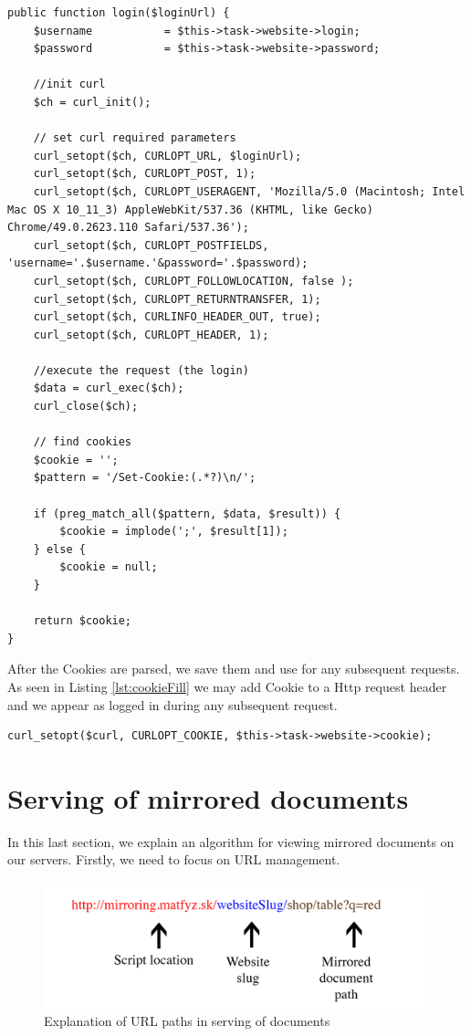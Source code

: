 \begin{lstlisting}[caption={Retrieving of a Cookie with Curl library},label={lst:login}]
public function login($loginUrl) {
    $username           = $this->task->website->login;
    $password           = $this->task->website->password;

    //init curl
    $ch = curl_init();
	
	// set curl required parameters
    curl_setopt($ch, CURLOPT_URL, $loginUrl);
    curl_setopt($ch, CURLOPT_POST, 1);
    curl_setopt($ch, CURLOPT_USERAGENT, 'Mozilla/5.0 (Macintosh; Intel Mac OS X 10_11_3) AppleWebKit/537.36 (KHTML, like Gecko) Chrome/49.0.2623.110 Safari/537.36');
    curl_setopt($ch, CURLOPT_POSTFIELDS, 'username='.$username.'&password='.$password);
    curl_setopt($ch, CURLOPT_FOLLOWLOCATION, false );
    curl_setopt($ch, CURLOPT_RETURNTRANSFER, 1);
    curl_setopt($ch, CURLINFO_HEADER_OUT, true);
    curl_setopt($ch, CURLOPT_HEADER, 1);

    //execute the request (the login)
    $data = curl_exec($ch);
    curl_close($ch);

    // find cookies
    $cookie = '';
    $pattern = '/Set-Cookie:(.*?)\n/';

    if (preg_match_all($pattern, $data, $result)) {
        $cookie = implode(';', $result[1]);
    } else {
        $cookie = null;
    }

    return $cookie;
}
\end{lstlisting}

After the Cookies are parsed, we save them and use for any subsequent requests. As seen in Listing \ref{lst:cookieFill} we may add Cookie to a Http request header and we appear as logged in during any subsequent request.

\begin{lstlisting}[caption={Adding Cookie to HTTP header using Curl},label={lst:cookieFill}]
curl_setopt($curl, CURLOPT_COOKIE, $this->task->website->cookie);
\end{lstlisting}

\section{Serving of mirrored documents}
\label{sec:serving}
In this last section, we explain an algorithm for viewing mirrored documents on our servers. Firstly, we need to focus on URL management.

\begin{figure}[h]
    \centering
    \includegraphics[width=\textwidth]{images/urls.png}
    \caption{Explanation of URL paths in serving of documents}
    \label{fig:urls}
\end{figure}

